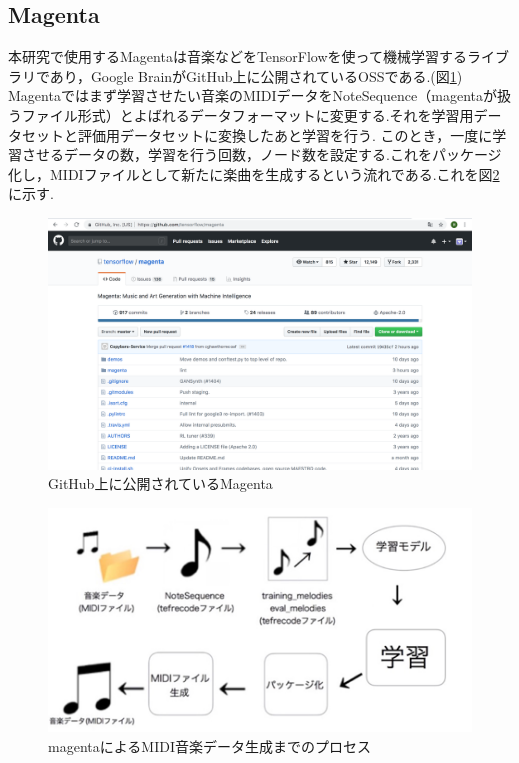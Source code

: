 \subsection{Magenta}
本研究で使用するMagentaは音楽などをTensorFlowを使って機械学習するライブラリであり，Google BrainがGitHub上に公開されているOSSである.(図\ref{fig:GitHub上に公開されているMagenta})
Magentaではまず学習させたい音楽のMIDIデータをNoteSequence（magentaが扱うファイル形式）とよばれるデータフォーマットに変更する.それを学習用データセットと評価用データセットに変換したあと学習を行う.
このとき，一度に学習させるデータの数，学習を行う回数，ノード数を設定する.これをパッケージ化し，MIDIファイルとして新たに楽曲を生成するという流れである.これを図\ref{fig:magentaによるMIDI音楽データ生成までのプロセス}に示す.
\begin{figure}[h]
    \begin{screen}
    \begin{center}
        \includegraphics[scale=0.3, clip]{./img/magentagithub.png}
        \caption{GitHub上に公開されているMagenta}
        \label{fig:GitHub上に公開されているMagenta}
    \end{center}
    \end{screen}
\end{figure}
\newpage
\begin{figure}[h]
    \begin{screen}
    \begin{center}
        \includegraphics[scale=1.7, clip]{./img/magenta_usestep.png}
        \caption{magentaによるMIDI音楽データ生成までのプロセス}
        \label{fig:magentaによるMIDI音楽データ生成までのプロセス}
    \end{center}
    \end{screen}
\end{figure}
\newpage
